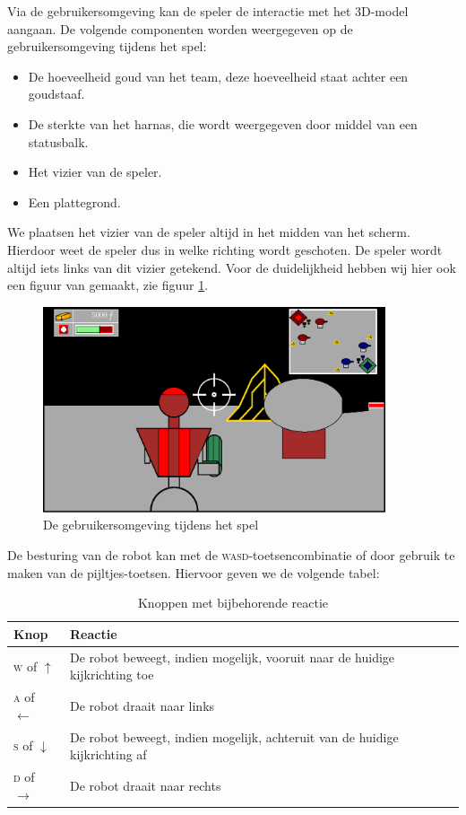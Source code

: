     Via de gebruikersomgeving kan de speler de interactie met het 3D-model aangaan. De volgende componenten worden weergegeven op de gebruikersomgeving tijdens het spel:
    \begin{itemize}
    \item De hoeveelheid goud van het team, deze hoeveelheid staat achter een goudstaaf.
    \item De sterkte van het harnas, die wordt weergegeven door middel van een statusbalk.
    \item Het vizier van de speler.
    \item Een plattegrond.
    \end{itemize}

    We plaatsen het vizier van de speler altijd in het midden van het scherm. Hierdoor weet de speler dus in welke richting wordt geschoten. De speler wordt altijd iets links van dit vizier getekend. Voor de duidelijkheid hebben wij hier ook een figuur van gemaakt, zie figuur \ref{fig:UI}.
    \begin{figure}[H]
    \includegraphics[width=0.9\textwidth]{../Graphics/UI.eps}
    \caption{De gebruikersomgeving tijdens het spel}
    \label{fig:UI}
    \end{figure}
    De besturing van de robot kan met de \textsc{wasd}-toetsencombinatie of door gebruik te maken van de pijltjes-toetsen. Hiervoor geven we de volgende tabel:
    \begin{table}[H]
        \small
        \centering
        \begin{tabular}{| l | l |}
        \hline
        Knop & Reactie \\ \hline
        \textsc{w} of $\uparrow$ & De robot beweegt, indien mogelijk, vooruit naar de huidige kijkrichting toe \\ \hline
        \textsc{a} of $\leftarrow$ & De robot draait naar links \\ \hline
        \textsc{s} of $\downarrow$ & De robot beweegt, indien mogelijk, achteruit van de huidige kijkrichting af \\ \hline
        \textsc{d} of $\rightarrow$ & De robot draait naar rechts \\ \hline
        \end{tabular}
        \caption{Knoppen met bijbehorende reactie}
        \label{tab:planning}
    \end{table}

